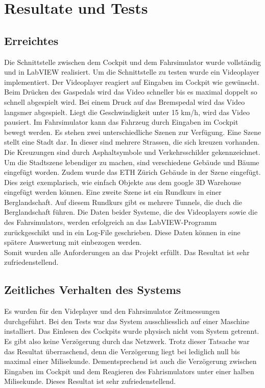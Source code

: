 \section{Resultate und Tests}
\subsection{Erreichtes}
Die Schnittstelle zwischen dem Cockpit und dem Fahrsimulator wurde vollständig und in LabVIEW realisiert. Um die Schnittstelle zu testen wurde ein Videoplayer implementiert. Der Videoplayer reagiert auf Eingaben im Cockpit wie gewünscht. Beim Drücken des Gaspedals wird das Video schneller bis es maximal doppelt so schnell abgespielt wird. Bei einem Druck auf das Bremspedal wird das Video langsmer abgespielt. Liegt die Geschwindigkeit unter 15 km/h, wird das Video pausiert. Im Fahrsimulator kann das Fahrzeug durch Eingaben im Cockpit bewegt werden. Es stehen zwei unterschiedliche Szenen zur Verfügung. Eine Szene stellt eine Stadt dar. In dieser sind mehrere Strassen, die sich kreuzen vorhanden. Die Kreuzungen sind durch Asphaltsymbole und Verkehrsschilder gekennzeichnet. Um die Stadtszene lebendiger zu machen, sind verschiedene Gebäude und Bäume eingefügt worden. Zudem wurde das ETH Zürich Gebäude in der Szene eingefügt. Dies zeigt exemplarisch, wie einfach Objekte aus dem google 3D Warehouse eingefügt werden können. Eine zweite Szene ist ein Rundkurs in einer Berglandschaft. Auf diesem Rundkurs gibt es mehrere Tunnels, die duch die Berglandschaft führen. 
Die Daten beider Systeme, die des Videoplayers sowie die des Fahrsimulators, werden erfolgreich an das LabVIEW-Programm zurückgeschikt und in ein Log-File geschrieben. Diese Daten können in eine spätere Auswertung mit einbezogen werden.\\
Somit wurden alle Anforderungen an das Projekt erfüllt. Das Resultat ist sehr zufriedenstellend. 
\subsection{Zeitliches Verhalten des Systems}
Es wurden für den Videplayer und den Fahrsimulator Zeitmessungen durchgeführt. Bei den Tests war das System ausschliesslich auf einer Maschine installiert. Das Einlesen des Cockpits wurde physisch nicht vom System getrennt. Es gibt also keine Verzögerung durch das Netzwerk. Trotz dieser Tatsache war das Resultat überraschend, denn die Verzögerung liegt bei lediglich null bis maximal einer Milisekunde. Dementsprechend ist auch die Verzögerung zwischen Eingaben im Cockpit und dem Reagieren des Fahrismulators unter einer halben Milisekunde. Dieses Resultat ist sehr zufriedenstellend. 
